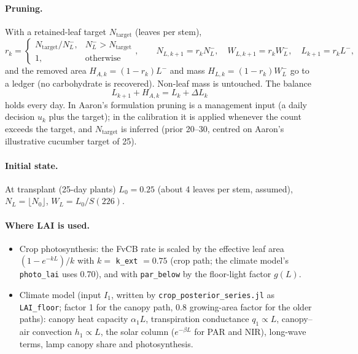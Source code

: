\documentclass[11pt,a4paper]{article}
\begin{document}
\paragraph{Pruning.} With a retained-leaf target $N_{\text{target}}$ (leaves per stem),
\begin{equation}\label{eq:lai-prune}
r_k=\begin{cases}N_{\text{target}}/N_L^-, & N_L^->N_{\text{target}}\\ 1,&\text{otherwise}\end{cases},\qquad
N_{L,k+1}=r_kN_L^-,\quad W_{L,k+1}=r_kW_L^-,\quad L_{k+1}=r_kL^-,
\end{equation}
and the removed area $H_{A,k}=(1-r_k)L^-$ and mass $H_{L,k}=(1-r_k)W_L^-$ go to a ledger (no carbohydrate is
recovered). Non-leaf mass is untouched. The balance
\begin{equation}
L_{k+1}+H_{A,k}=L_k+\Delta L_k
\end{equation}
holds every day. In Aaron's formulation pruning is a management input (a daily decision $u_k$ plus the target); in the
calibration it is applied whenever the count exceeds the target, and $N_{\text{target}}$ is inferred (prior 20--30, centred
on Aaron's illustrative cucumber target of 25).

\paragraph{Initial state.} At transplant (25-day plants) $L_0=0.25$ (about 4 leaves per stem, assumed),
$N_L=\lfloor N_0\rfloor$, $W_L=L_0/S(226)$.

\paragraph{Where LAI is used.}
\begin{itemize}[nosep]
\item Crop photosynthesis: the FvCB rate is scaled by the effective leaf area $(1-e^{-k L})/k$ with
$k=$ \texttt{k\_ext} $=0.75$ (crop path; the climate model's \texttt{photo\_lai} uses 0.70), and with \texttt{par\_below}
by the floor-light factor $g(L)$.
\item Climate model (input $I_1$, written by \texttt{crop\_posterior\_series.jl} as \texttt{LAI\_floor}; factor 1 for the
canopy path, 0.8 growing-area factor for the older paths): canopy heat capacity $\alpha_1L$, transpiration
conductance $q_1\propto L$, canopy--air convection $h_1\propto L$, the solar column ($e^{-\beta L}$ for PAR and NIR),
long-wave terms, lamp canopy share and photosynthesis.
\end{itemize}
\end{document}
